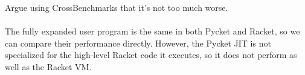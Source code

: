 		\begin{mainpoint}
				Argue using CrossBenchmarks that it's not too much worse.
		\end{mainpoint}

		\paragraph{}%
		The fully expanded user program is the same in both Pycket and Racket, so we can compare their performance directly.  However, the Pycket JIT is not specialized for the high-level Racket code it executes, so it does not perform as well as the Racket VM.






